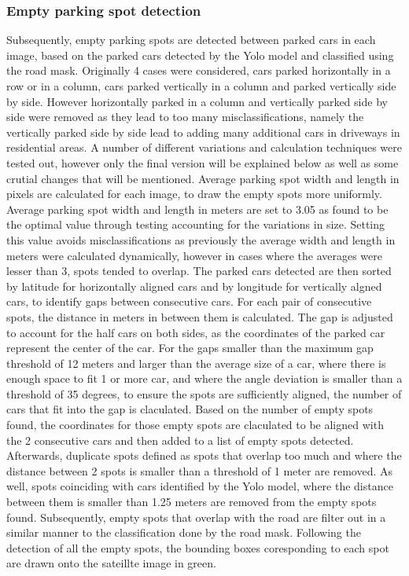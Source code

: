 \subsubsection{Empty parking spot detection}
Subsequently, empty parking spots are detected between parked cars in each image, based on the parked cars detected by the Yolo model and classified using the road mask.
Originally 4 cases were considered, cars parked horizontally in a row or in a column, cars parked vertically in a column and parked vertically side by side. However horizontally parked in a column and vertically parked side by side were removed as they lead to too many misclassifications, namely the vertically parked side by side lead to adding many additional cars in driveways in residential areas.
A number of different variations and calculation techniques were tested out, however only the final version will be explained below as well as some crutial changes that will be mentioned.
Average parking spot width and length in pixels are calculated for each image, to draw the empty spots more uniformly. Average parking spot width and length in meters are set to 3.05 as found to be the optimal value through testing accounting for the variations in size. 
Setting this value avoids misclassifications as previously the average width and length in meters were calculated dynamically, however in cases where the averages were lesser than 3, spots tended to overlap. 
The parked cars detected are then sorted by latitude for horizontally aligned cars and by longitude for vertically algned cars, to identify gaps between consecutive cars.
For each pair of consecutive spots, the distance in meters in between them is calculated. The gap is adjusted to account for the half cars on both sides, as the coordinates of the parked car represent the center of the car.
For the gaps smaller than the maximum gap threshold of 12 meters and larger than the average size of a car, where there is enough space to fit 1 or more car, and where the angle deviation is smaller than a threshold of 35 degrees, to ensure the spots are sufficiently aligned, the number of cars that fit into the gap is claculated.
Based on the number of empty spots found, the coordinates for those empty spots are claculated to be aligned with the 2 consecutive cars and then added to a list of empty spots detected.
Afterwards, duplicate spots defined as spots that overlap too much and where the distance between 2 spots is smaller than a threshold of 1 meter are removed.
As well, spots coinciding with cars identified by the Yolo model, where the distance between them is smaller than 1.25 meters are removed from the empty spots found.
Subsequently, empty spots that overlap with the road are filter out in a similar manner to the classification done by the road mask.
Following the detection of all the empty spots, the bounding boxes coresponding to each spot are drawn onto the sateillte image in green.

